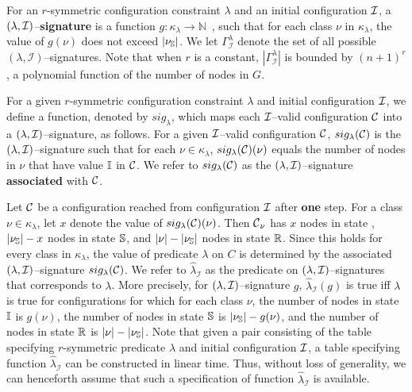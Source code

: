 For an $r$-symmetric configuration constraint $\lambda$
and an initial configuration $\mbox{${\cal I}$}{}$,
a $(\lambda,\mbox{${\cal I}$}{})$--\textbf{signature} is a function 
$g : \kappa_{\lambda} \longrightarrow \mathbb{N}$~, 
such that for each class $\nu$  in
$\kappa_{\lambda}$, the value of $g(\nu)$ does not exceed $|\mbox{$\nu_{\mathbb{S}}$}{}|$.
We let $\Gamma_{\mathcal{I}}^{\lambda}$ denote the
set of all possible $(\lambda,\mathcal{I})$--signatures.  
Note that when
$r$ is a constant, $|\Gamma_{\mathcal{I}}^{\lambda}|$ is bounded by
$(n+1)^r$, a polynomial function of the number of nodes in $G$.

\medskip
For a given $r$-symmetric configuration constraint $\lambda$
and initial configuration $\mbox{${\cal I}$}{}$,
we define a function,
denoted by $sig_\lambda$, 
which maps each $\mbox{${\cal I}$}{}$--valid configuration $\mbox{${\cal C}$}{}$
into a $(\lambda,\mbox{${\cal I}$}{})$--signature, as follows.
For a given $\mbox{${\cal I}$}{}$--valid configuration $\mbox{${\cal C}$}{}$,
$sig_\lambda(\mbox{${\cal C}$})$ is the $(\lambda,\mbox{${\cal I}$}{})$--signature
such that for each $\nu  \in \kappa_{\lambda}$,
$sig_\lambda(\mbox{${\cal C}$})(\nu)$
equals the number of nodes in $\nu$
that have value $\mbox{$\mathbb{I}$}$ in $\mbox{${\cal C}$}$.
We refer to $sig_\lambda(\mbox{${\cal C}$})$ as 
the $(\lambda,\mbox{${\cal I}$}{})$--signature \textbf{associated} 
with $\mbox{${\cal C}$}$.

Let $\mbox{${\cal C}$}$ be a configuration reached from configuration ${\mbox{${\cal I}$}}$ after {\bf one} step.
For a class  $\nu  \in \kappa_{\lambda}$,
let $x$ denote the value of $sig_\lambda(\mbox{${\cal C}$})(\nu)$.
Then $\mbox{${\cal C}$}_{\nu}$ has $x$ nodes in state \istate{},
$|\mbox{$\nu_{\mathbb{S}}$}{}| - x$ nodes in state $\mbox{$\mathbb{S}$}$,
and $|\nu| - |\mbox{$\nu_{\mathbb{S}}$}|$ nodes in state $\mbox{$\mathbb{R}$}$.
Since this holds for every class in  $\kappa_{\lambda}$,
the value of predicate $\lambda$ on $C$ is determined by 
the associated $(\lambda,\mbox{${\cal I}$}{})$--signature $sig_\lambda(\mbox{${\cal C}$})$.
We refer to $\widehat{\lambda}_{\mathcal{I}}$ as the predicate on 
$(\lambda,\mbox{${\cal I}$}{})$--signatures that corresponds to $\lambda$. 
More precisely, for $(\lambda,\mbox{${\cal I}$}{})$--signature $g$,
$\widehat{\lambda}_{\mathcal{I}}(g)$ is true iff
$\lambda$ is true for configurations for which for each class $\nu$,
the number of nodes in state $\mbox{$\mathbb{I}$}{}$ is $g(\nu)$,
the number of nodes in state $\mbox{$\mathbb{S}$}{}$ is $|\mbox{$\nu_{\mathbb{S}}$}{}| - g(\nu)$,
and the number of nodes in state $\mbox{$\mathbb{R}$}$ is $|\nu| - |\mbox{$\nu_{\mathbb{S}}$}|$.
Note that given a pair consisting of 
the table specifying $r$-symmetric predicate $\lambda$
and initial configuration ${\mbox{${\cal I}$}}$,
a table specifying function $\widehat{\lambda}_{\mathcal{I}}$ 
can be constructed in linear time.
Thus, without loss of generality, we can henceforth assume that 
such a specification of function $\widehat{\lambda}_{\mathcal{I}}$
is available.

